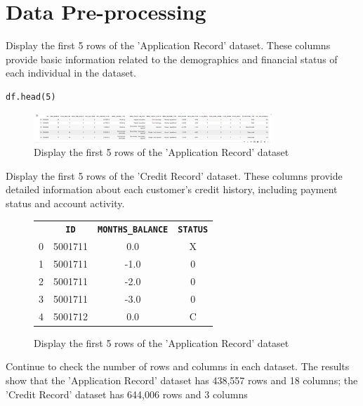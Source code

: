\documentclass[12pt]{report}
\begin{document}
    \section{Data Pre-processing}
    Display the first 5 rows of the 'Application Record' dataset. These columns provide basic information related to the demographics and financial status of each individual in the dataset.
    
    \begin{lstlisting}[style=default, language=python*, gobble=3]
        df.head(5)
    \end{lstlisting}

    \begin{figure}[h!]
        \centering
        \includegraphics[width=0.8\textwidth]{resources/pic/Display the first 5 rows of the 'Application Record' dataset.png}
        \caption{Display the first 5 rows of the 'Application Record' dataset}
        \label{fig:Display the first 5 rows of the 'Application Record' dataset}
    \end{figure}

    Display the first 5 rows of the 'Credit Record' dataset. These columns provide detailed information about each customer's credit history, including payment status and account activity.

    \begin{figure}[h!]
        \centering
        \begin{tabular}{|c|c|c|c|}
            \textbf{ } & \textbf{\texttt{ID}} & \textbf{\texttt{MONTHS\_BALANCE}} & \textbf{\texttt{STATUS}} \\
            0 & 5001711 & 0.0 & X \\
            1 & 5001711 & -1.0 & 0 \\
            2 & 5001711 & -2.0 & 0 \\
            3 & 5001711 & -3.0 & 0 \\
            4 & 5001712 & 0.0 & C \\
        \end{tabular}
        \caption{Display the first 5 rows of the 'Application Record' dataset}
    \end{figure}

    Continue to check the number of rows and columns in each dataset. The results show that the 'Application Record' dataset has 438,557 rows and 18 columns; the 'Credit Record' dataset has 644,006 rows and 3 columns
\end{document}
